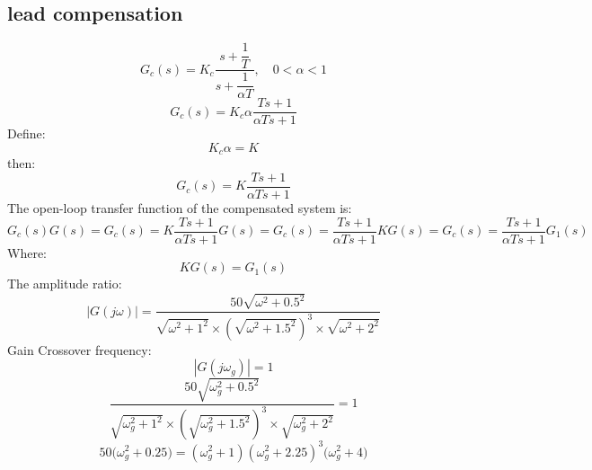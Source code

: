 \subsection{lead compensation}
$$
G_c(s) = K_c\dfrac{s + \dfrac{1}{T}}{s+\dfrac{1}{\alpha T}}, \quad 0 < \alpha < 1
$$
$$
G_c(s) = K_c \alpha \dfrac{Ts + 1}{\alpha T s + 1}
$$
Define:
$$K_c\alpha = K$$
then:
$$
G_c(s) = K \dfrac{Ts + 1}{\alpha T s + 1}
$$
The open-loop transfer function of the compensated system is:
$$
G_c(s)G(s) = G_c(s) = K \dfrac{Ts + 1}{\alpha T s + 1} G(s)
= G_c(s) = \dfrac{Ts + 1}{\alpha T s + 1}KG(s) = G_c(s) = \dfrac{Ts + 1}{\alpha T s + 1}G_1(s)
$$
Where:
$$
KG(s)= G_1(s)
$$
The amplitude ratio:
$$
\left\vert G(j\omega) \right\vert = \dfrac{50\sqrt{\omega^2+0.5^2}}{\sqrt{\omega^2+1^2}\times(\sqrt{\omega^2 + 1.5^2})^3\times\sqrt{\omega^2 + 2^2}}
$$
Gain Crossover frequency:
$$
\left\vert G(j\omega_g) \right\vert = 1
$$
\newline
$$
\dfrac{50\sqrt{\omega_g^2+0.5^2}}{\sqrt{\omega_g^2+1^2}\times(\sqrt{\omega_g^2 + 1.5^2})^3\times\sqrt{\omega_g^2 + 2^2}} = 1
$$
$$
{50({\omega_g^2+0.25}}) = 
{({\omega_g^2+1})({\omega_g^2 + 2.25})^3({\omega_g^2 + 4}})
$$